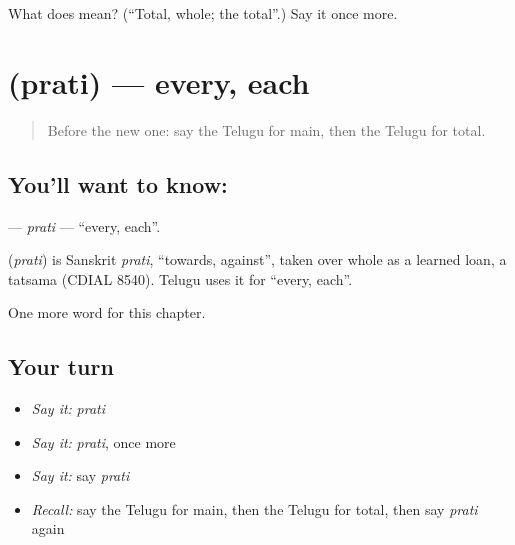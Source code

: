 \begin{tcolorbox}[breakable,colback=teal!4,colframe=teal!35!black,title={Before you move on}]
What does  mean? (\textquotedblleft{}Total, whole; the total\textquotedblright{}.) Say it once more.
\end{tcolorbox}
\section[\texorpdfstring{\te{ప్రతి} (prati)}{ప్రతి (prati)}]{ (prati) — every, each}

\label{lesson:TE-C180-prati}



\begin{quote}
Before the new one: say the Telugu for main, then the Telugu for total.
\end{quote}

\subsection*{You'll want to know: }
\textbf{} — \emph{prati} — \textquotedblleft{}every, each\textquotedblright{}.

\begin{cousinweb}
\textbf{} (\emph{prati}) is Sanskrit \emph{prati}, \textquotedblleft{}towards, against\textquotedblright{}, taken over whole as a learned loan, a tatsama (CDIAL 8540). Telugu uses it for \textquotedblleft{}every, each\textquotedblright{}.
\end{cousinweb}

\begin{grammarlens}[title={What you've built}]
One more word for this chapter.
\end{grammarlens}

\subsection*{Your turn}
\begin{itemize}
\raggedright
  \item \emph{Say it:} \emph{prati}
  \item \emph{Say it:} \emph{prati}, once more
  \item \emph{Say it:} say \emph{prati}
  \item \emph{Recall:} say the Telugu for main, then the Telugu for total, then say \emph{prati} again
\end{itemize}

